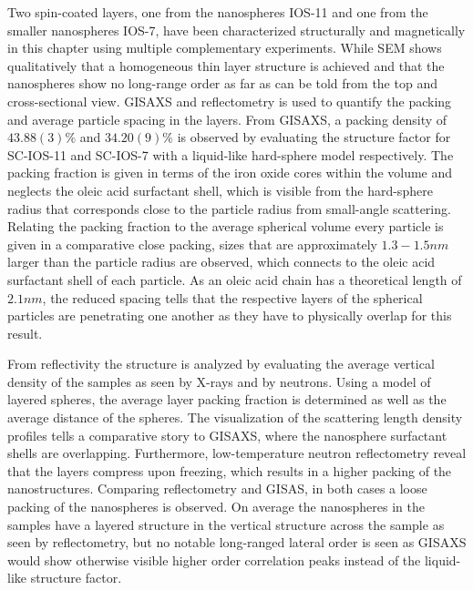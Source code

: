 \documentclass[\main/dresen_thesis.tex]{subfiles}
\begin{document}
  \label{sec:looselyPackedNS:layers:summary}
  Two spin-coated layers, one from the nanospheres IOS-11 and one from the smaller nanospheres IOS-7, have been characterized structurally and magnetically in this chapter using multiple complementary experiments.
  While SEM shows qualitatively that a homogeneous thin layer structure is achieved and that the nanospheres show no long-range order as far as can be told from the top and cross-sectional view.
  GISAXS and reflectometry is used to quantify the packing and average particle spacing in the layers.
  From GISAXS, a packing density of $43.88(3) \%$ and $34.20(9) \%$ is observed by evaluating the structure factor for SC-IOS-11 and SC-IOS-7 with a liquid-like hard-sphere model respectively.
  The packing fraction is given in terms of the iron oxide cores within the volume and neglects the oleic acid surfactant shell, which is visible from the hard-sphere radius that corresponds close to the particle radius from small-angle scattering.
  Relating the packing fraction to the average spherical volume every particle is given in a comparative close packing, sizes that are approximately $1.3 - 1.5 \unit{nm}$ larger than the particle radius are observed, which connects to the oleic acid surfactant shell of each particle.
  As an oleic acid chain has a theoretical length of $2.1 \unit{nm}$, the reduced spacing tells that the respective layers of the spherical particles are penetrating one another as they have to physically overlap for this result.

  From reflectivity the structure is analyzed by evaluating the average vertical density of the samples as seen by X-rays and by neutrons.
  Using a model of layered spheres, the average layer packing fraction is determined as well as the average distance of the spheres.
  The visualization of the scattering length density profiles tells a comparative story to GISAXS, where the nanosphere surfactant shells are overlapping.
  Furthermore, low-temperature neutron reflectometry reveal that the layers compress upon freezing, which results in a higher packing of the nanostructures.
  Comparing reflectometry and GISAS, in both cases a loose packing of the nanospheres is observed.
  On average the nanospheres in the samples have a layered structure in the vertical structure across the sample as seen by reflectometry, but no notable long-ranged lateral order is seen as GISAXS would show otherwise visible higher order correlation peaks instead of the liquid-like structure factor.
\end{document}
